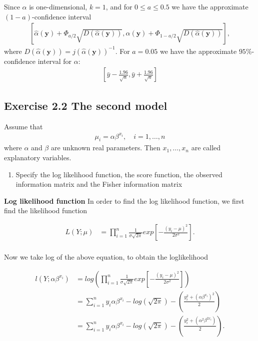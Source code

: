 Since $\alpha$ is one-dimensional, $k=1$, and for $0\leq a \leq 0.5$ we have the approximate $(1-a)$-confidence interval
\begin{align*}
\left[ \hat{\alpha}(\mathbf{y}) + \Phi_{a/2} \sqrt{D\left( \hat{\alpha}\left(\mathbf{y}\right)\right)}, \hat{\alpha}(\mathbf{y}) + \Phi_{1 - a/2} \sqrt{D\left( \hat{\alpha}\left(\mathbf{y}\right)\right)} \right],
\end{align*}
where $D\left(\hat{\alpha}(\mathbf{y})\right) = j\left(\hat{\alpha}(\mathbf{y})\right)^{-1}$.
For $a=0.05$ we have the approximate $95\%$-confidence interval for $\alpha$:
\begin{align*}
\left[ \bar{y} - \frac{1.96}{\sqrt{n}}, \bar{y} + \frac{1.96}{\sqrt{n}} \right]    
\end{align*}

\subsection*{Exercise 2.2 The second model}

Assume that
\begin{align*}
    \mu_i=\alpha \beta^{x_i}, \quad i=1,\ldots, n
\end{align*}
where $\alpha$ and $\beta$ are unknown real parameters. Then $x_1, \ldots,x_n$ are called explanatory variables. 

\begin{enumerate}
    \item Specify the log likelihood function, the score function, the observed information matrix and the Fisher information matrix
\end{enumerate}

\textbf{Log likelihood function}
In order to find the log likelihood function, we first find the likelihood function

\begin{align*}
   L(Y;\mu) &= \prod_{i=1}^n \frac{1}{\sigma \sqrt{2 \pi}}exp\left[-\frac{(y_i -\mu)^2}{2 \sigma^2}\right].\\
\end{align*}

Now we take log of the above equation, to obtain the loglikelihood

\begin{align*}
   l(Y;\alpha \beta^{x_i}) &= log \left( \prod_{i=1}^n \frac{1}{\sigma \sqrt{2 \pi}}exp\left[-\frac{(y_i -\mu)^2}{2 \sigma^2}\right] \right)\\
   &= \sum_{i = 1}^n y_i \alpha \beta^{x_i} - log\left( \sqrt{2 \pi}\right) - \left( \frac{y_i^2 + (\alpha \beta^{x_i})^2}{2} \right)\\
   &=\sum_{i = 1}^n y_i \alpha \beta^{x_i} - log\left( \sqrt{2 \pi}\right) - \left( \frac{y_i^2 + (\alpha^2 \beta^{2x_i})}{2} \right).\\
\end{align*}

